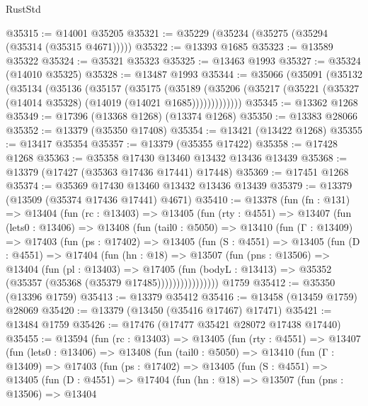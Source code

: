 \begin{lexlean}{RustStd}
\begin{coremodule}
@35315 := @14001 @35205
@35321 := @35229 (@35234 (@35275 (@35294 (@35314 (@35315 @4671)))))
@35322 := @13393 @1685
@35323 := @13589 @35322
@35324 := @35321 @35323
@35325 := @13463 @1993
@35327 := @35324 (@14010 @35325)
@35328 := @13487 @1993
@35344 := @35066
    (@35091
      (@35132
        (@35134
          (@35136
            (@35157
              (@35175
                (@35189
                  (@35206 (@35217 (@35221 (@35327 (@14014 @35328) (@14019 (@14021 @1685)))))))))))))
@35345 := @13362 @1268
@35349 := @17396 (@13368 @1268) (@13374 @1268)
@35350 := @13383 @28066
@35352 := @13379 (@35350 @17408)
@35354 := @13421 (@13422 @1268)
@35355 := @13417 @35354
@35357 := @13379 (@35355 @17422)
@35358 := @17428 @1268
@35363 := @35358 @17430 @13460 @13432 @13436 @13439
@35368 := @13379 (@17427 (@35363 @17436 @17441) @17448)
@35369 := @17451 @1268
@35374 := @35369 @17430 @13460 @13432 @13436 @13439
@35379 := @13379 (@13509 (@35374 @17436 @17441) @4671)
@35410 := @13378
    (fun (fn : @131) =>
    @13404
      (fun (rc : @13403) =>
      @13405
        (fun (rty : @4551) =>
        @13407
          (fun (lets0 : @13406) =>
          @13408
            (fun (tail0 : @5050) =>
            @13410
              (fun (Γ : @13409) =>
              @17403
                (fun (ps : @17402) =>
                @13405
                  (fun (S : @4551) =>
                  @13405
                    (fun (D : @4551) =>
                    @17404
                      (fun (hn : @18) =>
                      @13507
                        (fun (pns : @13506) =>
                        @13404
                          (fun (pl : @13403) =>
                          @17405
                            (fun (bodyL : @13413) =>
                            @35352 (@35357 (@35368 (@35379 @17485))))))))))))))))
    @1759
@35412 := @35350 (@13396 @1759)
@35413 := @13379 @35412
@35416 := @13458 (@13459 @1759) @28069
@35420 := @13379 (@13450 (@35416 @17467) @17471)
@35421 := @13484 @1759
@35426 := @17476 (@17477 @35421 @28072 @17438 @17440)
@35455 := @13594
    (fun (rc : @13403) =>
    @13405
      (fun (rty : @4551) =>
      @13407
        (fun (lets0 : @13406) =>
        @13408
          (fun (tail0 : @5050) =>
          @13410
            (fun (Γ : @13409) =>
            @17403
              (fun (ps : @17402) =>
              @13405
                (fun (S : @4551) =>
                @13405
                  (fun (D : @4551) =>
                  @17404
                    (fun (hn : @18) =>
                    @13507
                      (fun (pns : @13506) =>
                      @13404

\end{coremodule}
\end{lexlean}
